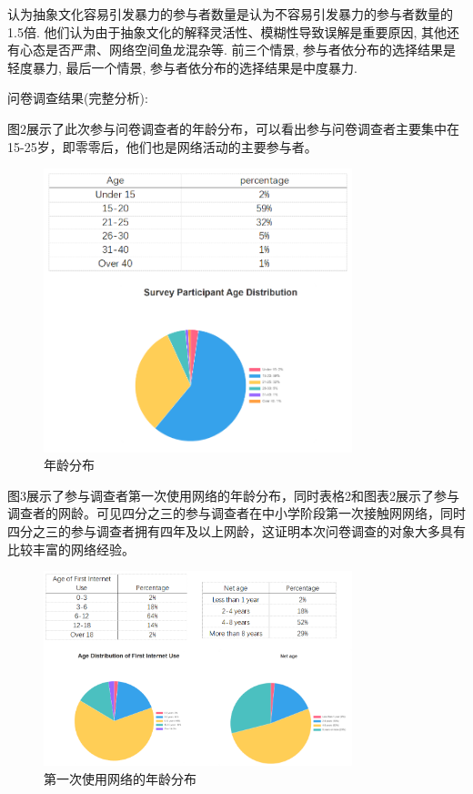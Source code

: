\documentclass[12pt,a4paper]{ctexart}
\begin{document}
认为抽象文化容易引发暴力的参与者数量是认为不容易引发暴力的参与者数量的1.5倍.
他们认为由于抽象文化的解释灵活性、模糊性导致误解是重要原因, 其他还有心态是否严肃、网络空间鱼龙混杂等.
前三个情景, 参与者依分布的选择结果是轻度暴力, 最后一个情景, 参与者依分布的选择结果是中度暴力.

问卷调查结果(完整分析):

图2展示了此次参与问卷调查者的年龄分布，可以看出参与问卷调查者主要集中在15-25岁，即零零后，他们也是网络活动的主要参与者。

\begin{figure}[htbp]
    \centering
    \includegraphics[width=0.8\textwidth]{img/age_distribution.png}
    \caption{年龄分布}
    \label{fig:age_distribution}
\end{figure}

图3展示了参与调查者第一次使用网络的年龄分布，同时表格2和图表2展示了参与调查者的网龄。可见四分之三的参与调查者在中小学阶段第一次接触网网络，同时四分之三的参与调查者拥有四年及以上网龄，这证明本次问卷调查的对象大多具有比较丰富的网络经验。

\begin{figure}[htbp]
    \centering
    \includegraphics[width=0.8\textwidth]{img/first_use_age_distribution.png}
    \caption{第一次使用网络的年龄分布}
    \label{fig:first_use_age_distribution}
\end{figure}
\end{document}
